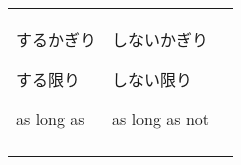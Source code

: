 \documentclass[12pt, a4j, landscape, dvipdfmx]{utarticle}
\begin{document}
\begin{minipage}[t][0pt]{\linewidth }
\begin{tabular}{||p{5.5cm}||p{5.5cm}||p{5.5cm}||}
            \hspace*{-.4cm} {\LARGE するかぎり}\newline
            \rule{0pt}{3ex} \hspace*{.4cm} {\small
            する限り}\newline \rule{0pt}{3ex} \hspace*{.425cm}
            {\small as long as}&\rule{0pt}{3ex}
            \hspace*{-.4cm} {\LARGE しないかぎり}\newline
            \rule{0pt}{3ex} \hspace*{.4cm} {\small
            しない限り}\newline \rule{0pt}{3ex} \hspace*{.425cm}
            {\small as long as not}&\rule{0pt}{3ex}
            \hspace*{-.4cm} {\LARGE }\newline
            \rule{0pt}{3ex} \hspace*{.4cm} {\small }\newline
            \rule{0pt}{3ex} \hspace*{.425cm} {\small
            }\tabularnewline \hhline{|b:=:b:=:b:=:b|} 
        \end{tabular} 
    \end{minipage} 
\end{document}
